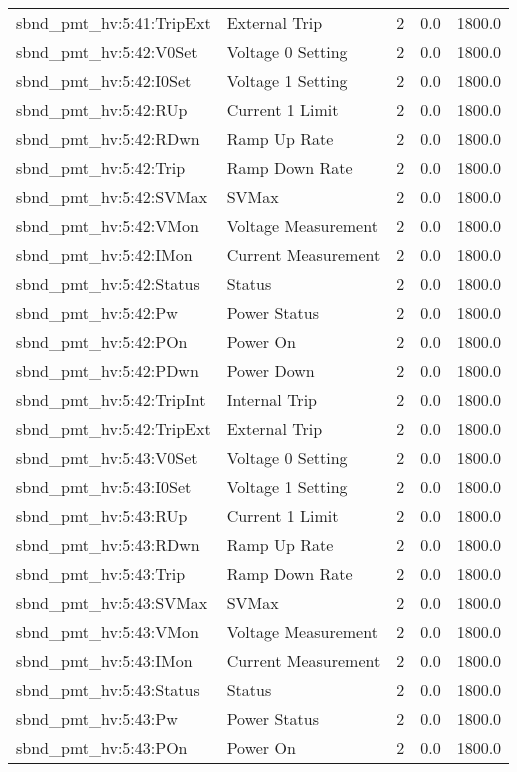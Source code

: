 \begin{center}
\begin{longtable}{l | l l l l }
sbnd\_pmt\_hv:5:41:TripExt & External Trip & 2 & 0.0 & 1800.0\\ 
sbnd\_pmt\_hv:5:42:V0Set & Voltage 0 Setting & 2 & 0.0 & 1800.0\\ 
sbnd\_pmt\_hv:5:42:I0Set & Voltage 1 Setting & 2 & 0.0 & 1800.0\\ 
sbnd\_pmt\_hv:5:42:RUp & Current 1 Limit & 2 & 0.0 & 1800.0\\ 
sbnd\_pmt\_hv:5:42:RDwn & Ramp Up Rate & 2 & 0.0 & 1800.0\\ 
sbnd\_pmt\_hv:5:42:Trip & Ramp Down Rate & 2 & 0.0 & 1800.0\\ 
sbnd\_pmt\_hv:5:42:SVMax & SVMax & 2 & 0.0 & 1800.0\\ 
sbnd\_pmt\_hv:5:42:VMon & Voltage Measurement & 2 & 0.0 & 1800.0\\ 
sbnd\_pmt\_hv:5:42:IMon & Current Measurement & 2 & 0.0 & 1800.0\\ 
sbnd\_pmt\_hv:5:42:Status & Status & 2 & 0.0 & 1800.0\\ 
sbnd\_pmt\_hv:5:42:Pw & Power Status & 2 & 0.0 & 1800.0\\ 
sbnd\_pmt\_hv:5:42:POn & Power On & 2 & 0.0 & 1800.0\\ 
sbnd\_pmt\_hv:5:42:PDwn & Power Down & 2 & 0.0 & 1800.0\\ 
sbnd\_pmt\_hv:5:42:TripInt & Internal Trip & 2 & 0.0 & 1800.0\\ 
sbnd\_pmt\_hv:5:42:TripExt & External Trip & 2 & 0.0 & 1800.0\\ 
sbnd\_pmt\_hv:5:43:V0Set & Voltage 0 Setting & 2 & 0.0 & 1800.0\\ 
sbnd\_pmt\_hv:5:43:I0Set & Voltage 1 Setting & 2 & 0.0 & 1800.0\\ 
sbnd\_pmt\_hv:5:43:RUp & Current 1 Limit & 2 & 0.0 & 1800.0\\ 
sbnd\_pmt\_hv:5:43:RDwn & Ramp Up Rate & 2 & 0.0 & 1800.0\\ 
sbnd\_pmt\_hv:5:43:Trip & Ramp Down Rate & 2 & 0.0 & 1800.0\\ 
sbnd\_pmt\_hv:5:43:SVMax & SVMax & 2 & 0.0 & 1800.0\\ 
sbnd\_pmt\_hv:5:43:VMon & Voltage Measurement & 2 & 0.0 & 1800.0\\ 
sbnd\_pmt\_hv:5:43:IMon & Current Measurement & 2 & 0.0 & 1800.0\\ 
sbnd\_pmt\_hv:5:43:Status & Status & 2 & 0.0 & 1800.0\\ 
sbnd\_pmt\_hv:5:43:Pw & Power Status & 2 & 0.0 & 1800.0\\ 
sbnd\_pmt\_hv:5:43:POn & Power On & 2 & 0.0 & 1800.0\\ 

\end{longtable}
\end{center}
